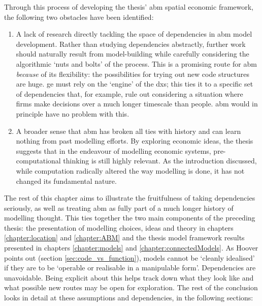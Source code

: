 Through this process of developing the thesis' \gls{abm} spatial economic framework, the following two obstacles have been identified:

\begin{enumerate}
	\item A lack of research directly tackling the space of dependencies in \gls{abm} model development. Rather than studying dependencies abstractly, further work should naturally result from model-building while carefully considering the algorithmic `nuts and bolts' of the process. This is a promising route for \gls{abm} \emph{because} of its flexibility: the possibilities for trying out new code structures are huge. \gls{ge} must rely on the `engine' of the \gls{dxs}; this ties it to a specific set of dependencies that, for example, rule out considering a situation where firms make decisions over a much longer timescale than people. \gls{abm} would in principle have no problem with this. 
	\item A broader sense that \gls{abm} has broken all ties with history and can learn nothing from past modelling efforts. By exploring economic ideas, the thesis suggests that in the endeavour of modelling economic systems, pre-computational thinking is still highly relevant. As the introduction discussed, while computation  radically altered the way modelling is done, it has not changed its fundamental nature. 
\end{enumerate}

The rest of this chapter aims to illustrate the fruitfulness of taking dependencies seriously, as well as treating \gls{abm} as fully part of a much longer history of modelling thought. This ties together the two main components of the preceding thesis: the presentation of modelling choices, ideas and theory in chapters \ref{chapter:location} and \ref{chapter:ABM} and the thesis model framework results presented in chapters \ref{chapter:models} and \ref{chapter:connectedModels}. As Hoover points out (section \ref{sec:code_vs_function}), models cannot be `cleanly idealised' if they are to be `operable or realisable in a manipulable form'. Dependencies are unavoidable. Being explicit about this helps track down what they look like and what possible new routes may be open for exploration. The rest of the conclusion looks in detail at these assumptions and dependencies, in the following sections:

